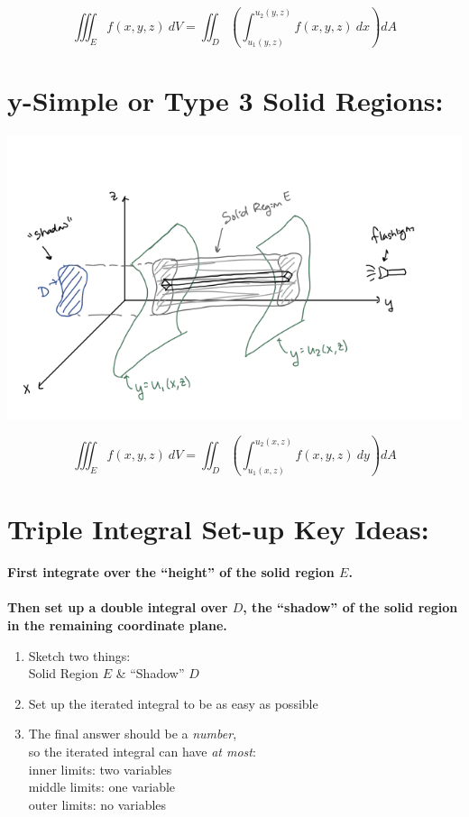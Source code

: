 \[
\iiint_E f(x,y,z)\ dV = \iint_D \left(\int_{u_1(y,z)}^{u_2(y,z)} f(x,y,z)\ dx\right) dA
\]



%
%

\section*{y-Simple or Type 3 Solid Regions:}


\includegraphics[width=\columnwidth]{Ch12s5-ySimple.png}

\[
\iiint_E f(x,y,z)\ dV = \iint_{D} \left( \int_{u_1(x,z)}^{u_2(x,z)} f(x,y,z)\ dy\right) dA
\]


\section*{Triple Integral Set-up Key Ideas:}

\textbf{First integrate over the ``height'' of the solid region \({E}\).}\\~\\
\textbf{Then set up a double integral over \({D}\), the ``shadow'' of the solid region in the remaining coordinate plane.}

\begin{enumerate}
\item Sketch two things:\\
Solid Region \( {E}\) \& ``Shadow'' \( {D}\)
\item Set up the iterated integral to be as easy as possible
\item The final answer should be a \textit{number},\\ so the iterated integral can have \textit{at most}:\\
inner limits: two variables\\
middle limits: one variable\\
outer limits: no variables
\end{enumerate}



